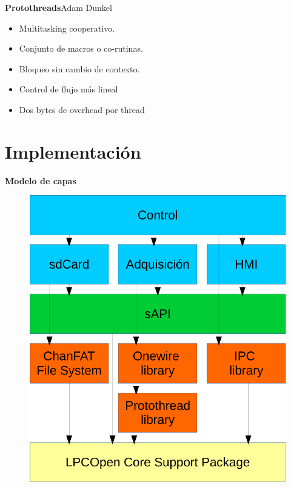 \documentclass[11pt, xcolor={table,xcdraw}]{beamer}
\begin{document}
\begin{frame}{\textbf{\LARGE{Protothreads}}}{Adam Dunkel}
	\vspace{-.3cm}
	\fontsize{18pt}{18}\selectfont
	\vspace{-.7cm}
	\centering
	\begin{itemize}
		\item Multitasking cooperativo.
		\vspace{15px}	
		\item Conjunto de macros o co-rutinas.
		\vspace{15px}
		\item Bloqueo sin cambio de contexto.
		\vspace{15px}
		\item Control de flujo más lineal
		\vspace{15px}
		\item Dos bytes de overhead por thread		
	\end{itemize}
\end{frame}
\section{Implementación}

\begin{frame}{\textbf{\LARGE{Modelo de capas}}}
	\vspace{-.7cm}
	\begin{figure}[H]
		\includegraphics[height=.8\textheight]{./imagenes/capas.pdf}
	\end{figure}	
\end{frame}
\end{document}
